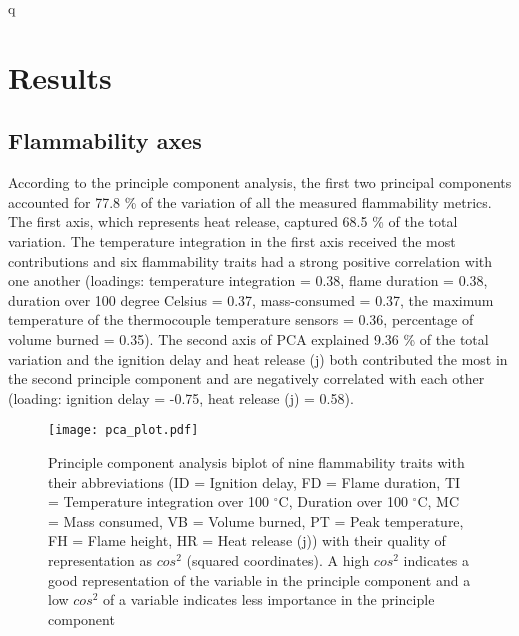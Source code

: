 \documentclass[12pt]{report}
\begin{document}
q
\section{Results}

\subsection{Flammability axes}
According to the principle component analysis, the first two principal components accounted for 77.8 \% of   the variation of all the measured flammability metrics. The first axis, which represents heat release, captured 68.5 \% of the total variation. The temperature integration in the first axis received the most contributions and six flammability traits had a strong positive correlation with one another (loadings: temperature integration = 0.38, flame duration = 0.38, duration over 100 degree Celsius = 0.37, mass-consumed = 0.37, the maximum temperature of the thermocouple temperature sensors = 0.36, percentage of volume burned = 0.35). The second axis of PCA explained 9.36 \% of the total variation and the ignition delay and heat release (j) both contributed the most in the second principle component and are negatively correlated with each other (loading: ignition delay = -0.75, heat release (j) = 0.58).

\begin{figure}
    \centering
    \texttt{[image: pca\_plot.pdf]}
    \caption{Principle component analysis biplot of nine flammability traits with their abbreviations (ID = Ignition delay, FD = Flame duration, TI = Temperature integration over 100 $^{\circ}$C, Duration over 100 $^{\circ}$C, MC = Mass consumed, VB = Volume burned, PT = Peak temperature, FH = Flame height, HR = Heat release (j)) with their quality of representation as $cos^2$ (squared coordinates). A high $cos^2$ indicates a good representation of the variable in the principle component and a low $cos^2$ of a variable indicates less importance in the principle component}
\end{figure}
\end{document}
